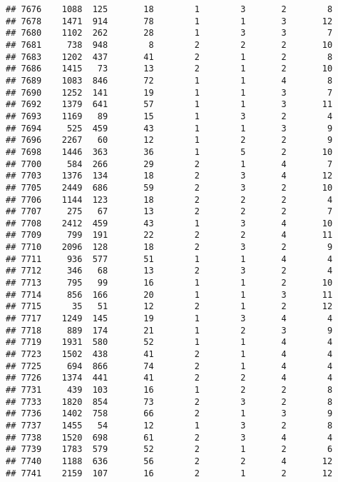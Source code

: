 \documentclass[]{article}
\begin{document}
\begin{verbatim}
## 7676    1088  125       18        1        3       2        8
## 7678    1471  914       78        1        1       3       12
## 7680    1102  262       28        1        3       3        7
## 7681     738  948        8        2        2       2       10
## 7683    1202  437       41        2        1       2        8
## 7686    1415   73       13        2        1       2       10
## 7689    1083  846       72        1        1       4        8
## 7690    1252  141       19        1        1       3        7
## 7692    1379  641       57        1        1       3       11
## 7693    1169   89       15        1        3       2        4
## 7694     525  459       43        1        1       3        9
## 7696    2267   60       12        1        2       2        9
## 7698    1446  363       36        1        5       2       10
## 7700     584  266       29        2        1       4        7
## 7703    1376  134       18        2        3       4       12
## 7705    2449  686       59        2        3       2       10
## 7706    1144  123       18        2        2       2        4
## 7707     275   67       13        2        2       2        7
## 7708    2412  459       43        1        3       4       10
## 7709     799  191       22        2        2       4       11
## 7710    2096  128       18        2        3       2        9
## 7711     936  577       51        1        1       4        4
## 7712     346   68       13        2        3       2        4
## 7713     795   99       16        1        1       2       10
## 7714     856  166       20        1        1       3       11
## 7715      35   51       12        2        1       2       12
## 7717    1249  145       19        1        3       4        4
## 7718     889  174       21        1        2       3        9
## 7719    1931  580       52        1        1       4        4
## 7723    1502  438       41        2        1       4        4
## 7725     694  866       74        2        1       4        4
## 7726    1374  441       41        2        2       4        4
## 7731     439  103       16        1        2       2        8
## 7733    1820  854       73        2        3       2        8
## 7736    1402  758       66        2        1       3        9
## 7737    1455   54       12        1        3       2        8
## 7738    1520  698       61        2        3       4        4
## 7739    1783  579       52        2        1       2        6
## 7740    1188  636       56        2        2       4       12
## 7741    2159  107       16        2        1       2       12

\end{verbatim}
\end{document}
